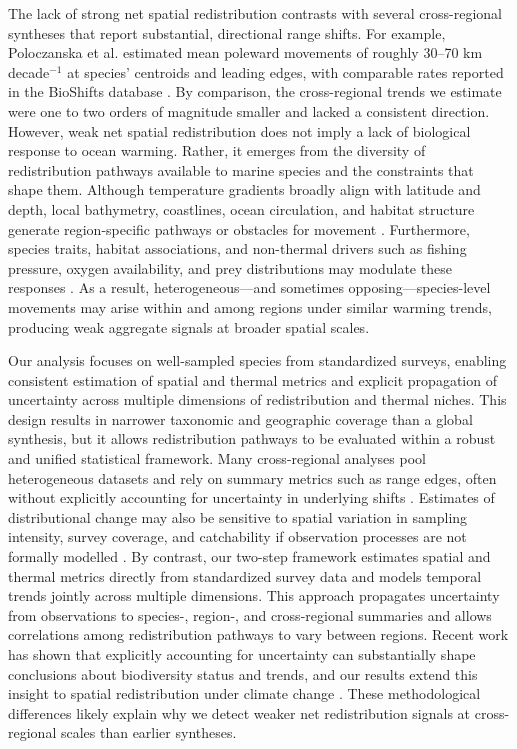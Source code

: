 \documentclass[pdflatex,sn-nature,referee]{sn-jnl}%
\begin{document}
The lack of strong net spatial redistribution contrasts with several cross-regional syntheses that report substantial, directional range shifts. For example, Poloczanska et al. \citep{poloczanska_global_2013} estimated mean poleward movements of roughly 30–70 km decade$^{-1}$ at species’ centroids and leading edges, with comparable rates reported in the BioShifts database \citep{lenoir_species_2020}. By comparison, the cross-regional trends we estimate were one to two orders of magnitude smaller and lacked a consistent direction. However, weak net spatial redistribution does not imply a lack of biological response to ocean warming. Rather, it emerges from the diversity of redistribution pathways available to marine species and the constraints that shape them. Although temperature gradients broadly align with latitude and depth, local bathymetry, coastlines, ocean circulation, and habitat structure generate region-specific pathways or obstacles for movement \citep{pinsky_marine_2013, garcia_molinos_climate_2016}. Furthermore, species traits, habitat associations, and non-thermal drivers such as fishing pressure, oxygen availability, and prey distributions may modulate these responses \citep{sunday_species_2015, deutsch_climate_2015, wisz_role_2013, bandara_importance_2024}. As a result, heterogeneous---and sometimes opposing---species-level movements may arise within and among regions under similar warming trends, producing weak aggregate signals at broader spatial scales.


Our analysis focuses on well-sampled species from standardized surveys, enabling consistent estimation of spatial and thermal metrics and explicit propagation of uncertainty across multiple dimensions of redistribution and thermal niches. This design results in narrower taxonomic and geographic coverage than a global synthesis, but it allows redistribution pathways to be evaluated within a robust and unified statistical framework. Many cross-regional analyses pool heterogeneous datasets and rely on summary metrics such as range edges, often without explicitly accounting for uncertainty in underlying shifts \citep{brown_ecological_2016, lenoir_species_2020, dahms_temperature_2023}. Estimates of distributional change may also be sensitive to spatial variation in sampling intensity, survey coverage, and catchability if observation processes are not formally modelled \citep{thorson_model-based_2016}. By contrast, our two-step framework estimates spatial and thermal metrics directly from standardized survey data and models temporal trends jointly across multiple dimensions. This approach propagates uncertainty from observations to species-, region-, and cross-regional summaries and allows correlations among redistribution pathways to vary between regions. Recent work has shown that explicitly accounting for uncertainty can substantially shape conclusions about biodiversity status and trends, and our results extend this insight to spatial redistribution under climate change \citep{johnson_revealing_2024}. These methodological differences likely explain why we detect weaker net redistribution signals at cross-regional scales than earlier syntheses.
\end{document}
